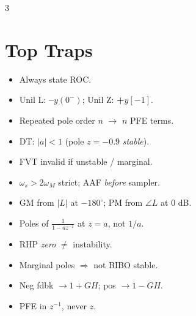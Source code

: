 \documentclass[8pt]{extarticle}
\begin{document}
\begin{multicols*}{3}
\section*{Top Traps}
\begin{itemize}
\item Always state ROC.
\item Unil L: \textbf{--}$y(0^-)$; Unil Z: \textbf{+}$y[-1]$.
\item Repeated pole order $n$ $\to$ $n$ PFE terms.
\item DT: $|a|<1$ (pole $z{=}{-}0.9$ \emph{stable}).
\item FVT invalid if unstable / marginal.
\item $\omega_s>2\omega_M$ strict; AAF \emph{before} sampler.
\item GM from $|L|$ at $-180^\circ$; PM from $\angle L$ at 0 dB.
\item Poles of $\tfrac{1}{1-az^{-1}}$ at $z{=}a$, not $1/a$.
\item RHP \emph{zero} $\ne$ instability.
\item Marginal poles $\Rightarrow$ not BIBO stable.
\item Neg fdbk $\to 1{+}GH$; pos $\to 1{-}GH$.
\item PFE in $z^{-1}$, never $z$.
\end{itemize}

\end{multicols*}
\end{document}
